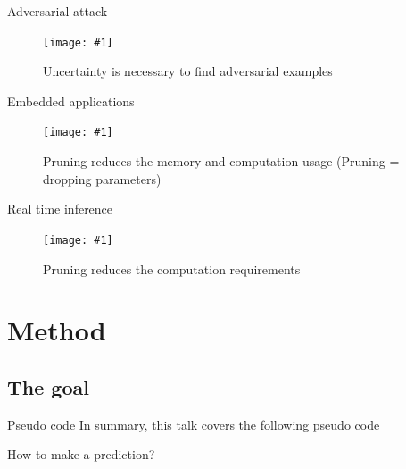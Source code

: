 \documentclass{beamer}
\newcommand{\fitfigure}[1]{\centering\texttt{[image: \#1]}}
\begin{document}
\begin{frame}{Adversarial attack}
	\begin{figure}
		\fitfigure{im/adversarial_attack.jpeg}
		\caption{Uncertainty is necessary to find adversarial examples}
	\end{figure}
\end{frame}

\begin{frame}{Embedded applications}
	\begin{figure}
		\fitfigure{im/raspberry_pi.jpg}
		\caption{Pruning reduces the memory and computation usage  (Pruning = dropping parameters)}
	\end{figure}
\end{frame}

\begin{frame}{Real time inference}
	\begin{figure}
		\fitfigure{im/real_time_inference.jpg}
		\caption{Pruning reduces the computation requirements}
	\end{figure}
\end{frame}



\section{Method}

\begin{frame}
	\centerline{  }
\end{frame}

\subsection{The goal}

\begin{frame}{Pseudo code}
	In summary, this talk covers the following pseudo code
	\centerline{  }
	
\end{frame}

\begin{frame}
	\centerline{How to make a prediction?}
\end{frame}
\end{document}
